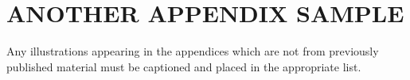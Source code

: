 \chapter{ANOTHER APPENDIX SAMPLE}
Any illustrations appearing in the appendices which are not from previously published material must be captioned and placed in the appropriate list.
